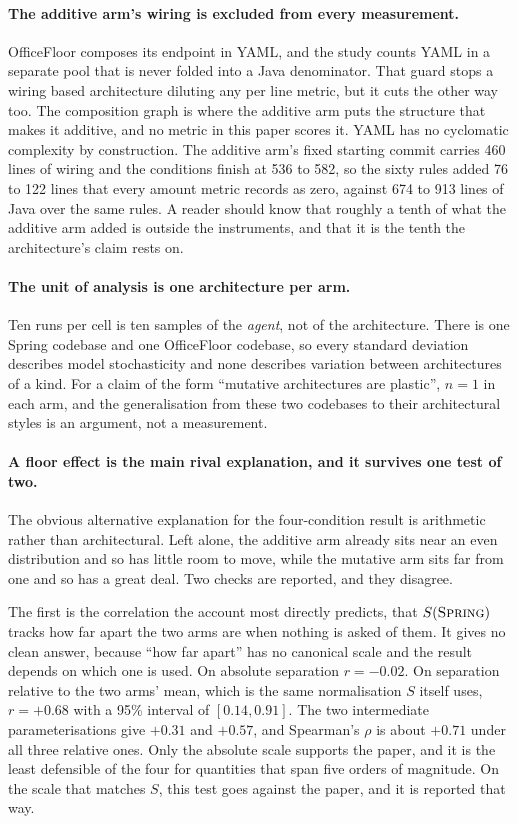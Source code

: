 \documentclass[11pt,a4paper]{article}
\newcommand{\sprg}{\textsc{Spring}}
\begin{document}
\paragraph{The additive arm's wiring is excluded from every measurement.}
OfficeFloor composes its endpoint in YAML, and the study counts YAML in a
separate pool that is never folded into a Java denominator. That guard stops a
wiring based architecture diluting any per line metric, but it cuts the other
way too. The composition graph is where the additive arm puts the structure that
makes it additive, and no metric in this paper scores it. YAML has no cyclomatic
complexity by construction. The additive arm's fixed starting commit carries 460
lines of wiring and the conditions finish at 536 to 582, so the sixty rules added
76 to 122 lines that every amount metric records as zero, against 674 to 913
lines of Java over the same rules. A reader should know that roughly a tenth of
what the additive arm added is outside the instruments, and that it is the tenth
the architecture's claim rests on.

\paragraph{The unit of analysis is one architecture per arm.} Ten runs per cell
is ten samples of the \emph{agent}, not of the architecture. There is one Spring
codebase and one OfficeFloor codebase, so every standard deviation describes
model stochasticity and none describes variation between architectures of a kind.
For a claim of the form ``mutative architectures are plastic'', $n = 1$ in each
arm, and the generalisation from these two codebases to their architectural
styles is an argument, not a measurement.

\paragraph{A floor effect is the main rival explanation, and it survives one
test of two.} The obvious alternative explanation for the four-condition result
is arithmetic rather than architectural. Left alone, the additive arm already
sits near an even distribution and so has little room to move, while the mutative
arm sits far from one and so has a great deal. Two checks are reported, and they
disagree.

The first is the correlation the account most directly predicts, that
$S(\sprg{})$ tracks how far apart the two arms are when nothing is asked of them.
It gives no clean answer, because ``how far apart'' has no canonical scale and the
result depends on which one is used. On absolute separation $r = -0.02$. On
separation relative to the two arms' mean, which is the same normalisation $S$
itself uses, $r = +0.68$ with a 95\% interval of $[0.14, 0.91]$. The two
intermediate parameterisations give $+0.31$ and $+0.57$, and Spearman's $\rho$ is
about $+0.71$ under all three relative ones. Only the absolute scale supports the
paper, and it is the least defensible of the four for quantities that span five
orders of magnitude. On the scale that matches $S$, this test goes against the
paper, and it is reported that way.
\end{document}
